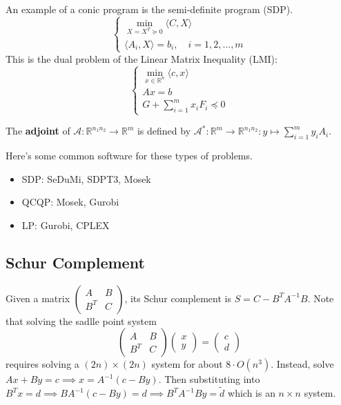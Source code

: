\documentclass[english, 11pt]{article}
\begin{document}
\begin{exmp}
An example of a conic program is the semi-definite program (SDP).
\[
\begin{cases}
\min \limits_{X =X^T \succeq 0} \langle C,X \rangle \\
\langle A_i , X \rangle = b_i, \quad i=1,2,\dots,m 
\end{cases}
\]
This is the dual problem of the Linear Matrix Inequality (LMI):
 \[
 \begin{cases}
\min \limits_{x \in \mathbb{R}^n} \langle c,x \rangle \\
Ax=b \\
G+\sum_{i=1}^m x_i F_i  \preceq 0
\end{cases}
\]
\end{exmp}


\begin{defn}[Adjoint]
The {\bf adjoint} of $\mathcal{A}: \mathbb{R}^{n_1 n_2} \to \mathbb{R}^m$ is defined by $\mathcal{A}^* : \mathbb{R}^m \to \mathbb{R}^{n_1 n_2} : y \mapsto \sum_{i=1}^m y_i A_i$.
\end{defn}

\begin{rem}
Here's some common software for these types of problems.
\begin{itemize}
\item SDP: SeDuMi, SDPT3, Mosek
\item QCQP: Mosek, Gurobi
\item LP: Gurobi, CPLEX 
\end{itemize}
\end{rem}


\subsection{Schur Complement}
Given a matrix $\begin{pmatrix} A & B \\ B^T & C \end{pmatrix}$, its Schur complement is $S = C - B^T A^{-1} B$. Note that solving the sadlle point system 
\[
\begin{pmatrix} A & B \\ B^T & C \end{pmatrix}
\begin{pmatrix} x \\ y \end{pmatrix}
 = \begin{pmatrix} c \\ d \end{pmatrix}
\]
requires solving a $(2n) \times (2n)$ system for about $8 \cdot O(n^3)$. Instead, solve $Ax + By =c \implies x = A^{-1}(c-By)$. Then substituting into $B^T x = d \implies BA^{-1}(c-By) = d \implies B^T A^{-1} B y = \tilde{d}$ which is an $n \times n$ system.
\end{document}
